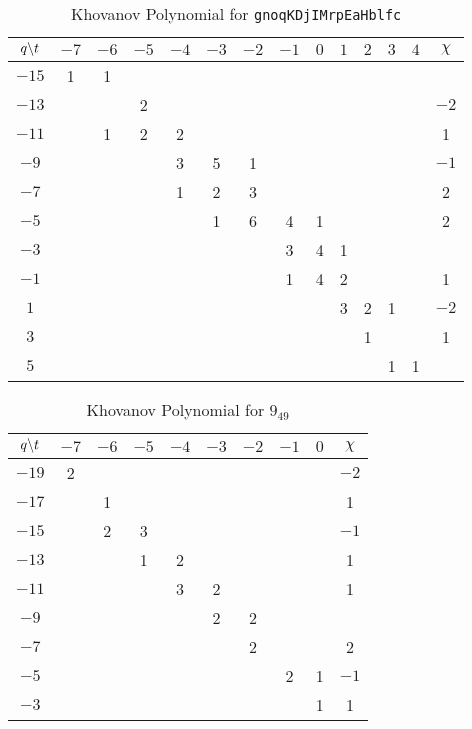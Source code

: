 \documentclass{article}
\theoremstyle{plain}
\begin{document}
        \begin{table}
            \centering
            \begin{tabular}{| c | c |c | c | c | c | c | c | c | c | c | c | c | c |}
                \hline
                $q\symbol{92}t$&$-7$&$-6$&$-5$&$-4$&$-3$&$-2$&$-1$&$0$&$1$&$2$&$3$&$4$&$\chi$\\
                \hline
                $-15$&1&1&&&&&&&&&&&\\
                \hline
                $-13$&&&2&&&&&&&&&&$-2$\\
                \hline
                $-11$&&1&2&2&&&&&&&&&1\\
                \hline
                $-9$&&&&3&5&1&&&&&&&$-1$\\
                \hline
                $-7$&&&&1&2&3&&&&&&&2\\
                \hline
                $-5$&&&&&1&6&4&1&&&&&2\\
                \hline
                $-3$&&&&&&&3&4&1&&&&\\
                \hline
                $-1$&&&&&&&1&4&2&&&&1\\
                \hline
                $1$&&&&&&&&&3&2&1&&$-2$\\
                \hline
                $3$&&&&&&&&&&1&&&1\\
                \hline
                $5$&&&&&&&&&&&1&1&\\
                \hline
            \end{tabular}
            \caption{Khovanov Polynomial for \texttt{gnoqKDjIMrpEaHblfc}}
        \end{table}
        \begin{table}
            \centering
            \begin{tabular}{| c | c | c | c | c | c | c | c | c | c |}
                \hline
                $q\symbol{92}t$&$-7$&$-6$&$-5$&$-4$&$-3$&$-2$&$-1$&$0$&$\chi$\\
                \hline
                $-19$&2&&&&&&&&$-2$\\
                \hline
                $-17$&&1&&&&&&&1\\
                \hline
                $-15$&&2&3&&&&&&$-1$\\
                \hline
                $-13$&&&1&2&&&&&1\\
                \hline
                $-11$&&&&3&2&&&&1\\
                \hline
                $-9$&&&&&2&2&&&\\
                \hline
                $-7$&&&&&&2&&&2\\
                \hline
                $-5$&&&&&&&2&1&$-1$\\
                \hline
                $-3$&&&&&&&&1&1\\
                \hline
            \end{tabular}
            \caption{Khovanov Polynomial for $9_{49}$}
        \end{table}
\end{document}
